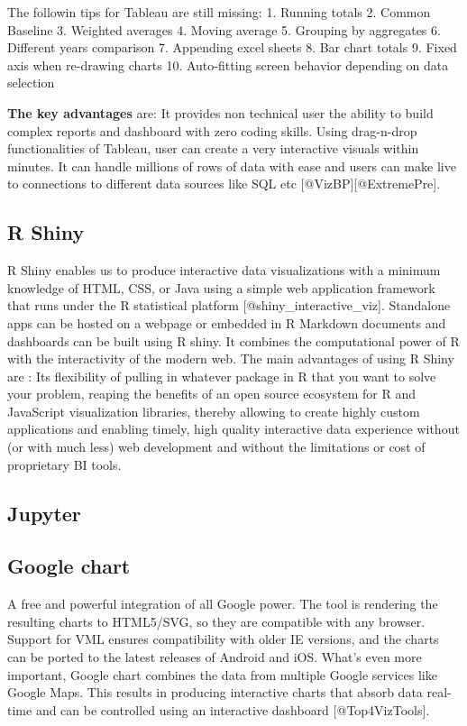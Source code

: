 \documentclass[]{book}
\theoremstyle{definition}
\theoremstyle{definition}
\theoremstyle{definition}
\theoremstyle{remark}
\begin{document}
The followin tips for Tableau are still missing: 1. Running totals 2.
Common Baseline 3. Weighted averages 4. Moving average 5. Grouping by
aggregates 6. Different years comparison 7. Appending excel sheets 8.
Bar chart totals 9. Fixed axis when re-drawing charts 10. Auto-fitting
screen behavior depending on data selection

\textbf{The key advantages} are: It provides non technical user the
ability to build complex reports and dashboard with zero coding skills.
Using drag-n-drop functionalities of Tableau, user can create a very
interactive visuals within minutes. It can handle millions of rows of
data with ease and users can make live to connections to different data
sources like SQL etc {[}@VizBP{]}{[}@ExtremePre{]}.

\subsection{R Shiny}\label{r-shiny}

R Shiny enables us to produce interactive data visualizations with a
minimum knowledge of HTML, CSS, or Java using a simple web application
framework that runs under the R statistical platform
{[}@shiny\_interactive\_viz{]}. Standalone apps can be hosted on a
webpage or embedded in R Markdown documents and dashboards can be built
using R shiny. It combines the computational power of R with the
interactivity of the modern web. The main advantages of using R Shiny
are : Its flexibility of pulling in whatever package in R that you want
to solve your problem, reaping the benefits of an open source ecosystem
for R and JavaScript visualization libraries, thereby allowing to create
highly custom applications and enabling timely, high quality interactive
data experience without (or with much less) web development and without
the limitations or cost of proprietary BI tools.

\subsection{Jupyter}\label{jupyter}

\subsection{Google chart}\label{google-chart}

A free and powerful integration of all Google power. The tool is
rendering the resulting charts to HTML5/SVG, so they are compatible with
any browser. Support for VML ensures compatibility with older IE
versions, and the charts can be ported to the latest releases of Android
and iOS. What's even more important, Google chart combines the data from
multiple Google services like Google Maps. This results in producing
interactive charts that absorb data real-time and can be controlled
using an interactive dashboard {[}@Top4VizTools{]}.
\end{document}
